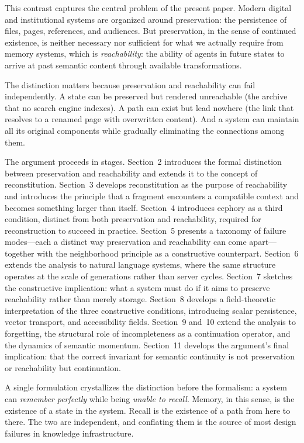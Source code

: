 \documentclass[12pt]{article}
\begin{document}
This contrast captures the central problem of the present paper.
Modern digital and institutional systems are organized around preservation:
the persistence of files, pages, references, and audiences.
But preservation, in the sense of continued existence, is neither necessary nor
sufficient for what we actually require from memory systems, which is
\emph{reachability}: the ability of agents in future states to arrive at past
semantic content through available transformations.

The distinction matters because preservation and reachability can fail
independently.
A state can be preserved but rendered unreachable (the archive that no search
engine indexes).
A path can exist but lead nowhere (the link that resolves to a renamed page
with overwritten content).
And a system can maintain all its original components while gradually
eliminating the connections among them.

The argument proceeds in stages.
Section~2 introduces the formal distinction between preservation and reachability
and extends it to the concept of reconstitution.
Section~3 develops reconstitution as the purpose of reachability and introduces
the principle that a fragment encounters a compatible context and becomes
something larger than itself.
Section~4 introduces ecphory as a third condition, distinct from both
preservation and reachability, required for reconstruction to succeed in
practice.
Section~5 presents a taxonomy of failure modes---each a distinct way
preservation and reachability can come apart---together with the neighborhood
principle as a constructive counterpart.
Section~6 extends the analysis to natural language systems, where the same
structure operates at the scale of generations rather than server cycles.
Section~7 sketches the constructive implication: what a system must do if it
aims to preserve reachability rather than merely storage.
Section~8 develops a field-theoretic interpretation of the three constructive
conditions, introducing scalar persistence, vector transport, and accessibility
fields.
Section~9 and~10 extend the analysis to forgetting, the structural role
of incompleteness as a continuation operator, and the dynamics of semantic
momentum.
Section~11 develops the argument's final implication: that the correct
invariant for semantic continuity is not preservation or reachability
but continuation.

A single formulation crystallizes the distinction before the formalism: a system
can \emph{remember perfectly} while being \emph{unable to recall}.
Memory, in this sense, is the existence of a state in the system.
Recall is the existence of a path from here to there.
The two are independent, and conflating them is the source of most design
failures in knowledge infrastructure.
\end{document}
